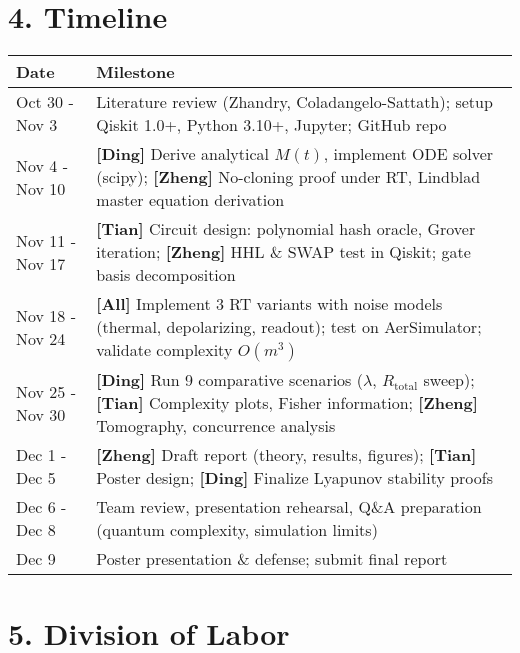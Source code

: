 \documentclass[a4paper,11pt,twoside]{article}
\begin{document}
\vspace{-4pt}
\section*{4. Timeline}
\vspace{-4pt}
\begin{center}
\begin{tabular}{|l|p{10.5cm}|}
\hline
\textbf{Date} & \textbf{Milestone} \\
\hline
Oct 30 - Nov 3 & Literature review (Zhandry, Coladangelo-Sattath); setup Qiskit 1.0+, Python 3.10+, Jupyter; GitHub repo \\
\hline
Nov 4 - Nov 10 & \textbf{[Ding]} Derive analytical $M(t)$, implement ODE solver (scipy); \textbf{[Zheng]} No-cloning proof under RT, Lindblad master equation derivation \\
\hline
Nov 11 - Nov 17 & \textbf{[Tian]} Circuit design: polynomial hash oracle, Grover iteration; \textbf{[Zheng]} HHL \& SWAP test in Qiskit; gate basis decomposition \\
\hline
Nov 18 - Nov 24 & \textbf{[All]} Implement 3 RT variants with noise models (thermal, depolarizing, readout); test on AerSimulator; validate complexity $O(m^3)$ \\
\hline
Nov 25 - Nov 30 & \textbf{[Ding]} Run 9 comparative scenarios ($\lambda$, $R_{\text{total}}$ sweep); \textbf{[Tian]} Complexity plots, Fisher information; \textbf{[Zheng]} Tomography, concurrence analysis \\
\hline
Dec 1 - Dec 5 & \textbf{[Zheng]} Draft report (theory, results, figures); \textbf{[Tian]} Poster design; \textbf{[Ding]} Finalize Lyapunov stability proofs \\
\hline
Dec 6 - Dec 8 & Team review, presentation rehearsal, Q\&A preparation (quantum complexity, simulation limits) \\
\hline
Dec 9 & Poster presentation \& defense; submit final report \\
\hline
\end{tabular}
\end{center}
\vspace{-4pt}
\section*{5. Division of Labor}
\vspace{-4pt}
\end{document}
